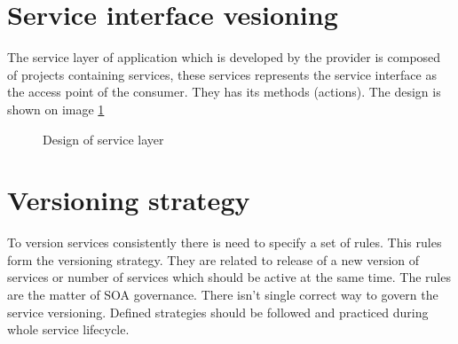 \section{Service interface vesioning}
\label{sec:interfaceversioning}

The service layer of application which is developed by the provider is composed of projects containing services, these services represents the service interface as the access point of the consumer. They has its methods (actions). The design is shown on image \ref{fig:service-layer-design}

\begin{figure}[htp] 
\caption{Design of service layer}
\label{fig:service-layer-design}
\end{figure} 


\bigskip 


\section{Versioning strategy}
To version services consistently there is need to specify a set of rules. This rules form the versioning strategy. They are related to release of a new version of services or number of services which should be active at the same time. The rules are the matter of SOA governance. There isn't single correct way to govern the service versioning. Defined strategies should be followed and practiced during whole service lifecycle. 


